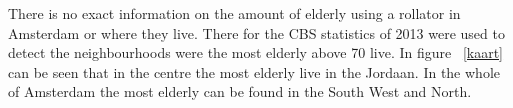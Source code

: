 There is no exact information on the amount of elderly using a rollator in Amsterdam or where they live. There for the CBS statistics of 2013 were used to detect the neighbourhoods were the most elderly above 70 live. In figure ~\ref{kaart} can be seen that in the centre the most elderly live in the Jordaan. In the whole of Amsterdam the most elderly can be found in the South West and North.  